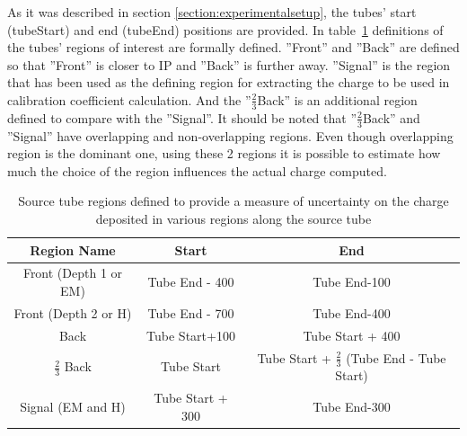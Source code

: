 As it was described in section \ref{section:experimentalsetup}, the tubes' start (tubeStart) and end (tubeEnd) positions are provided. In table~\ref{tab:TubeRegions} definitions of the tubes' regions of interest are formally defined. ''Front'' and ''Back'' are defined so that ''Front'' is closer to IP and ''Back'' is further away. ''Signal'' is the region that has been used as the defining region for extracting
the charge to be used in calibration coefficient calculation. And the ''$\frac{2}{3}$Back''
is an additional region defined to compare with the ''Signal''. It should be
noted that ''$\frac{2}{3}$Back'' and ''Signal'' have overlapping and non-overlapping
regions. Even though overlapping region is the dominant one, using these 2 regions it is possible to estimate how much the choice of the region influences the actual charge computed.
\begin{table}[!h]
    \centering
    \caption{Source tube regions defined to provide a measure of uncertainty on
    the charge deposited in various regions along the source tube}
    \begin{tabular}{|c|c|c|}
    \hline
    Region Name & Start & End \\
    \hline
    Front (Depth 1 or EM) & Tube End - 400 & Tube End-100 \\
    Front (Depth 2 or H) & Tube End - 700 & Tube End-400 \\
    Back & Tube Start+100 & Tube Start + 400 \\
    $\frac{2}{3}$ Back & Tube Start & Tube Start + $\frac{2}{3}$ (Tube End - Tube Start) \\
    Signal (EM and H) & Tube Start + 300 & Tube End-300 \\
    \hline
    \end{tabular}
    \label{tab:TubeRegions}
\end{table}

